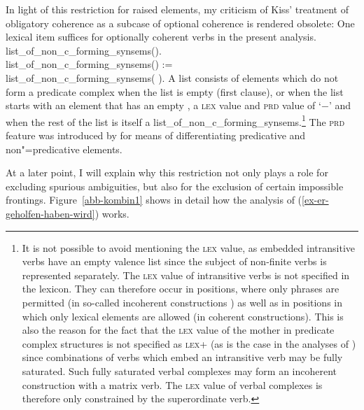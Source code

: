 {{{In light of this restriction for raised elements, my criticism \citep[--352]{Mueller99a} of Kiss' treatment of
		obligatory coherence as a subcase of optional coherence \citep[]{Kiss95a} is rendered obsolete: One lexical
		item suffices for optionally coherent verbs in the present analysis.
}
\ea
\label{constr-non-complex-forming}
list\_of\_non\_c\_forming\_synsems(\eliste).\\
list\_of\_non\_c\_forming\_synsems() :=\\
\flushright        list\_of\_non\_c\_forming\_synsems(  ).
\z
A list consists of elements which do not form a predicate complex when the list is empty (first
clause), or when the list starts with an element that has an empty \compsl, a \textsc{lex} value and
\textsc{prd} value of `$-$' and when the rest of the list  is itself a list\_of\_non\_c\_forming\_synsems.\footnote{
		It is not possible to avoid mentioning the \textsc{lex} value, as embedded intransitive verbs have
		an empty valence list since the subject of non-finite verbs is represented separately. The \textsc{lex} value of
		intransitive verbs is not specified in the lexicon. They can therefore occur in positions, 
		where only phrases are permitted (in so-called incoherent constructions \citep{Bech55a}) as
		well as in positions in which only lexical elements are allowed (in coherent constructions). 
		This is also the reason for the fact that the \textsc{lex} value of the mother in predicate complex
		structures is not specified as \textsc{lex}+ (as is the case in the analyses of \citealp{HN94a,dKM2001a}) since combinations
		of verbs which embed an intransitive verb may be fully saturated. Such fully
                saturated verbal complexes may form an incoherent construction with a matrix
                verb. The \textsc{lex} value of verbal complexes is therefore only constrained by the superordinate verb.%
}
The \textsc{prd} feature was introduced by \citet[--67]{ps} for means of differentiating predicative and non"=predicative
elements.

At a later point, I will explain why this restriction not only plays a role for excluding spurious
ambiguities, but also for the exclusion of certain impossible frontings.
Figure~\vref{abb-kombin1} shows in detail how the analysis of (\ref{ex-er-geholfen-haben-wird}) works.

}}
